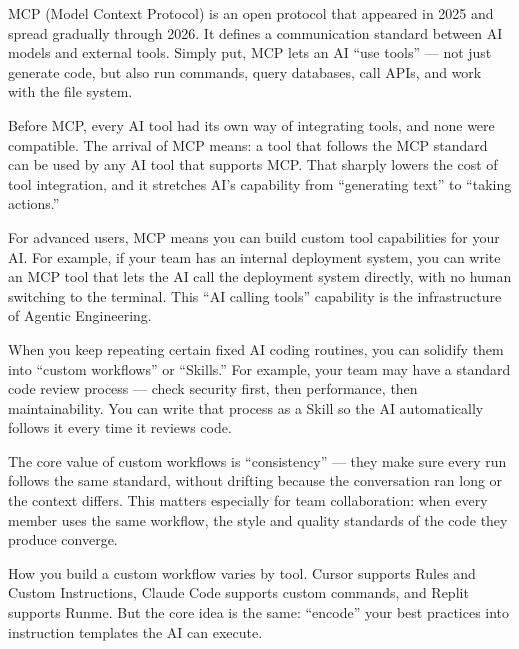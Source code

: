 


MCP (Model Context Protocol) is an open protocol that appeared in 2025 and spread gradually through 2026. It defines a communication standard between AI models and external tools. Simply put, MCP lets an AI “use tools” — not just generate code, but also run commands, query databases, call APIs, and work with the file system.

Before MCP, every AI tool had its own way of integrating tools, and none were compatible. The arrival of MCP means: a tool that follows the MCP standard can be used by any AI tool that supports MCP. That sharply lowers the cost of tool integration, and it stretches AI's capability from “generating text” to “taking actions.”

For advanced users, MCP means you can build custom tool capabilities for your AI. For example, if your team has an internal deployment system, you can write an MCP tool that lets the AI call the deployment system directly, with no human switching to the terminal. This “AI calling tools” capability is the infrastructure of Agentic Engineering.


When you keep repeating certain fixed AI coding routines, you can solidify them into “custom workflows” or “Skills.” For example, your team may have a standard code review process — check security first, then performance, then maintainability. You can write that process as a Skill so the AI automatically follows it every time it reviews code.

The core value of custom workflows is “consistency” — they make sure every run follows the same standard, without drifting because the conversation ran long or the context differs. This matters especially for team collaboration: when every member uses the same workflow, the style and quality standards of the code they produce converge.

How you build a custom workflow varies by tool. Cursor supports Rules and Custom Instructions, Claude Code supports custom commands, and Replit supports Runme. But the core idea is the same: “encode” your best practices into instruction templates the AI can execute.

